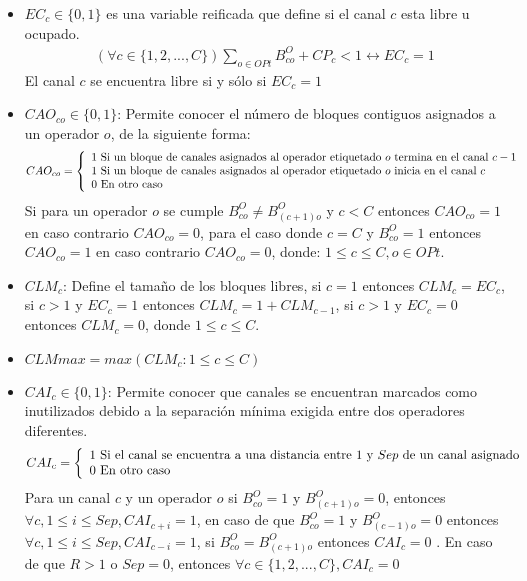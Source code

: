\begin{itemize}
	\item{$EC_{c} \in \{0,1\}$ es una variable reificada que define si el canal $c$ esta libre u ocupado.
	\begin{displaymath}
		\begin{array}{cc}
			(\forall c \in \{1,2,...,C\} ) \sum \limits_{o \in OPt} B^{O}_{co} + CP_{c} < 1 \leftrightarrow EC_{c} = 1
		\end{array}
	\end{displaymath}
	El canal $c$ se encuentra libre si y sólo si $EC_{c} = 1$}
	\item {$CAO_{co} \in \{0,1\}$: Permite conocer el número de bloques contiguos asignados a un operador $o$, de la siguiente forma:
	\begin{displaymath}
		CAO_{co} = \left\{ \begin{array}{lp{5cm}} 1  \textrm{ Si un bloque de canales asignados al operador etiquetado $o$ termina en el canal $c-1$ } \\1 \textrm{ Si un bloque de canales asignados al operador etiquetado $o$ inicia en el canal $c$ } \\0 \textrm{ En otro caso}\end{array}\right.
	\end{displaymath}	
	Si para un operador $o$ se cumple $B^{O}_{co} \neq B^{O}_{(c+1)o}$ y $c<C$ entonces $CAO_{co}=1$ en caso contrario $CAO_{co}=0$, para el caso donde $c=C$ y $B^{O}_{co}=1$ entonces $CAO_{co}=1$ en caso contrario $CAO_{co}=0$, donde: $1 \leq c \leq C, o \in OPt$.}
	\item $CLM_{c}$: Define el tamaño de los bloques libres, si $c=1$ entonces $CLM_{c}=EC_{c}$, si $c>1$ y $EC_{c}=1$ entonces  $CLM_{c}=1+CLM_{c-1}$, si $c > 1$ y $EC_{c}=0$  entonces $CLM_{c}=0$, donde $1 \leq c \leq C$.
	\item $CLMmax = max(CLM_c: 1 \leq c \leq C)$
	\item {$CAI_{c} \in \{0,1\}$: Permite conocer que canales se encuentran marcados como inutilizados debido a la separación mínima exigida entre dos operadores diferentes.
	\begin{displaymath}
		CAI_{c} = \left\{ \begin{array}{lp{5cm}} 1  \textrm{ Si el canal se encuentra a una distancia entre $1$ y $Sep$ de un canal asignado} \\0 \textrm{ En otro caso } \end{array}\right.
	\end{displaymath}		
	Para un canal $c$ y un operador $o$ si $B^{O}_{co}=1$ y $B^{O}_{(c+1)o}=0$, entonces $\forall c, 1 \leq i \leq Sep, CAI_{c+i}= 1$, en caso de que $B^{O}_{co}=1$ y $B^{O}_{(c-1)o}=0$ entonces  $\forall c, 1 \leq i \leq Sep, CAI_{c-i} = 1$, si $B^{O}_{co} = B^{O}_{(c+1)o}$ entonces $CAI_{c}=0$  . En caso de que $R>1$ o $Sep=0$, entonces $\forall c \in \{1,2,...,C\} , CAI_{c}=0$}
\end{itemize}


